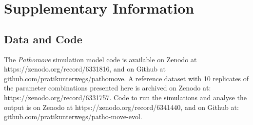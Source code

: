 


{ \begin{center}  \end{center} }

\newpage

\begingroup

\let\clearpage\relax
\let\cleardoublepage\relax
\let\cleardoublepage\relax

{\chapter*{Supplementary Information}}

\section*{Data and Code}

The \textit{Pathomove} simulation model code is available on Zenodo at https://zenodo.org/record/6331816, and on Github at github.com/pratikunterwegs/pathomove.
A reference dataset with 10 replicates of the parameter combinations presented here is archived on Zenodo at: https://zenodo.org/record/6331757.
Code to run the simulations and analyse the output is on Zenodo at https://zenodo.org/record/6341440, and on Github at: 
github.com/pratikunterwegs/patho-move-evol.

